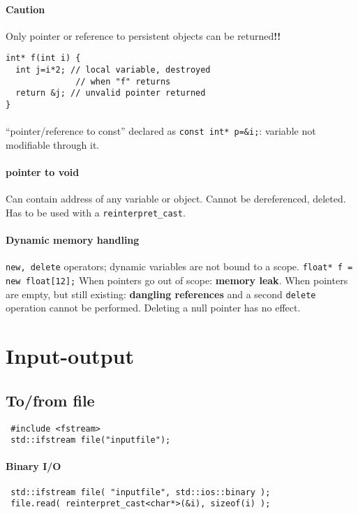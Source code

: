 \documentclass{article}
\newcommand{\code}[1]{\texttt {#1}}
\newcommand{\caut}{\textbf{!!}}
\begin{document}
\paragraph{Caution}
Only pointer or reference to persistent objects can be returned\caut
\begin{lstlisting}
int* f(int i) {
  int j=i*2; // local variable, destroyed
              // when "f" returns
  return &j; // unvalid pointer returned
}
\end{lstlisting}

\paragraph{}
“pointer/reference to const” declared as \code{const int* p=\&i;}: variable not modifiable through it.

\paragraph{pointer to void}
Can contain address of any variable or object. Cannot be dereferenced, deleted. Has to be used with a \code{reinterpret\_cast}.

\paragraph{Dynamic memory handling}
\code{new, delete} operators; dynamic variables are not bound to a scope.
\code{float* f = new float[12];}
When pointers go out of scope: \textbf{memory leak}.
When pointers are empty, but still existing: \textbf{dangling references} and a second \code{delete} operation cannot be performed. 
Deleting a null pointer has no effect. 

\section{Input-output}
\subsection{To/from file}
\begin{lstlisting}
 #include <fstream>
 std::ifstream file("inputfile");
\end{lstlisting}
\paragraph{Binary I/O}
\begin{lstlisting}
 std::ifstream file( "inputfile", std::ios::binary );
 file.read( reinterpret_cast<char*>(&i), sizeof(i) );
\end{lstlisting}
\end{document}
